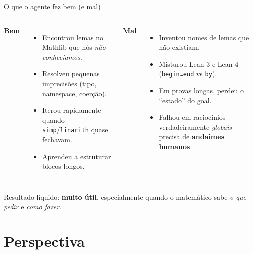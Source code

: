 \documentclass[10pt,aspectratio=169]{beamer}
\newcommand{\hl}[1]{{\color{accent}\textbf{#1}}}
\begin{document}
\begin{frame}{O que o agente fez bem (e mal)}
  \begin{columns}[T,onlytextwidth]
    \textbf{\color{accent}Bem}
    \begin{itemize}\small
      \item Encontrou lemas no Mathlib que nós \emph{não conhecíamos}.
      \item Resolveu pequenas imprecisões (tipo, namespace, coerção).
      \item Iterou rapidamente quando \texttt{simp}/\texttt{linarith}
            quase fechavam.
      \item Aprendeu a estruturar blocos
            longos.
    \end{itemize}
    \pause

    \textbf{\color{accentred}Mal}
    \begin{itemize}\small
      \item Inventou nomes de lemas que não existiam.
      \item Misturou Lean 3 e Lean 4 (\texttt{begin\ldots end} vs
            \texttt{by}).
      \item Em provas longas, perdeu o ``estado'' do goal.
      \item Falhou em raciocínios verdadeiramente \emph{globais} ---
             precisa de \hl{andaimes humanos}.
    \end{itemize}
  \end{columns}
  \vspace{0.8em}
  \pause
  \begin{center}\small\color{fgmute}
    Resultado líquido: \hl{muito útil}, especialmente quando o
    matemático sabe \emph{o que pedir} e \emph{como fazer}.
  \end{center}
\end{frame}

\section{Perspectiva}
\end{document}
